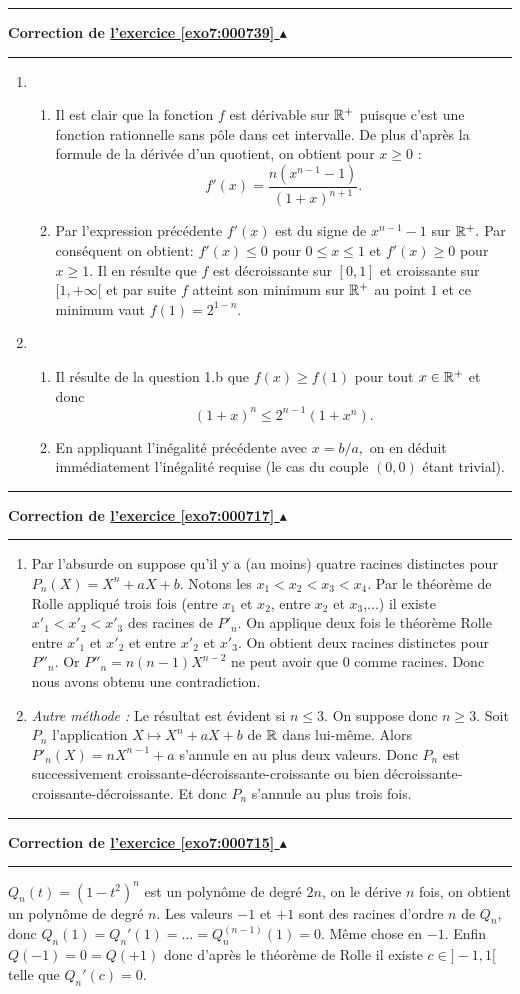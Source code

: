\documentclass[11pt,a4paper]{article}
\newcounter{exo}
\newcommand{\correction}[1]{\hypertarget{cor7:#1}{}\label{cor7:#1}{\bf Correction de \hyperlink{exo7:#1}{l'exercice \ref{exo7:#1} $\blacktriangle$}}\vspace{1mm}\hrule\vspace{1mm}}
\newcommand{\fincorrection}{\vspace{1mm}\hrule\vspace*{7mm}}
\begin{document}
\fincorrection
\correction{000739}
\begin{enumerate}
\item
  \begin{enumerate}
  \item
 Il est clair que la fonction $f$ est d\'erivable sur $\mathbb{R}^{+}$
puisque c'est une fonction rationnelle sans p\^ole dans cet
intervalle. De plus d'apr\`es la formule de la d\'eriv\'ee d'un
quotient, on obtient pour $x \geq 0$ :
$$ f' (x) = \frac{n (x^{n-1} - 1)}{(1 + x)^{n + 1}}.$$
  \item  Par l'expression pr\'ec\'edente $f' (x)$ est du signe de $x^{n - 1} - 1$ sur $\mathbb{R}^{+}.$ Par
cons\'equent on obtient: $ f' (x) \leq 0$ pour $0 \leq x \leq 1$
et $ f' (x) \geq 0$ pour $x \geq 1.$ Il en r\'esulte que $f$ est
d\'ecroissante sur $[0 , 1]$ et croissante sur $[1, + \infty[$ et
par suite $f$ atteint son minimum sur $\mathbb{R}^{+}$ au point $1$ et ce
minimum vaut $f (1) = 2^{1 - n}.$
  \end{enumerate}
\item
  \begin{enumerate}
  \item
 Il   r\'esulte de la
question 1.b que $f (x) \geq f (1)$ pour tout $x \in \mathbb{R}^{+}$ et
donc
$$ (1 + x)^n \leq 2^{n - 1} (1 + x^n).$$
 \item En appliquant l'in\'egalit\'e pr\'ec\'edente avec $ x = b \slash
a,$ on en d\'eduit imm\'ediatement l'in\'egalit\'e requise (le cas du couple $(0,0)$ étant trivial).
  \end{enumerate}
\end{enumerate}
\fincorrection
\correction{000717}
\begin{enumerate}
\item Par l'absurde on suppose qu'il y a (au moins) quatre racines distinctes  pour 
$  P_n(X) =  X^n+aX+b  $. Notons les $x_1 <x_2<x_3<x_4$.
Par le th\'eor\`eme de Rolle appliqu\'e trois fois (entre $x_1$ et $x_2$, entre $x_2$ et $x_3$,...) il existe $x'_1<x'_2<x'_3$ des racines de $P'_n$. On applique deux fois le th\'eor\`eme Rolle entre $x'_1$ et $x'_2$ et entre $x'_2$ et $x'_3$. On obtient deux racines distinctes pour $P''_n$. Or 
$P''_n = n(n-1)X^{n-2}$ ne peut avoir que $0$ comme racines. Donc nous avons 
obtenu une contradiction. 
\item \emph{Autre m\'ethode :} 
Le r\'esultat est \'evident si $  n\leq 3  .$ On suppose donc $
n\geq 3  .$ Soit $  P_n  $ l'application $  X\mapsto X^n+aX+b  $
de $  \mathbb{R}   $ dans lui-m\^eme. Alors $  P'_n(X)=nX^{n-1}+a  $
s'annule en au plus deux valeurs. Donc $P_n$ est successivement
croissante-d\'ecroissante-croissante ou bien
d\'ecroissante-croissante-d\'ecroissante. Et donc $P_n$ s'annule au plus 
trois fois.
\end{enumerate}
\fincorrection
\correction{000715}
$Q_n(t) = (1-t^2)^n$ est un polyn\^ome de degr\'e $2n$, on le d\'erive $n$ fois, on obtient un polyn\^ome de degr\'e $n$.
Les valeurs $-1$ et $+1$ sont des racines d'ordre $n$ de $Q_n$, donc
$Q_n(1)=Q_n'(1)=\ldots = Q_n^{(n-1)}(1)=0$. M\^eme chose en $-1$.
Enfin $Q(-1)=0=Q(+1)$ donc d'apr\`es le th\'eor\`eme de Rolle il existe $c \in ]-1,1[$ telle que $Q_n'(c)=0$. 
\end{document}
